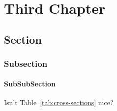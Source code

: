 \chapter{Third Chapter}



\section{Section}
\lipsum[1-2]

\subsection{Subsection}
\lipsum[1-2]

\subsubsection{SubSubSection}



Isn't Table~\ref{tab:cross-sections} nice?

\lipsum[1-2]


